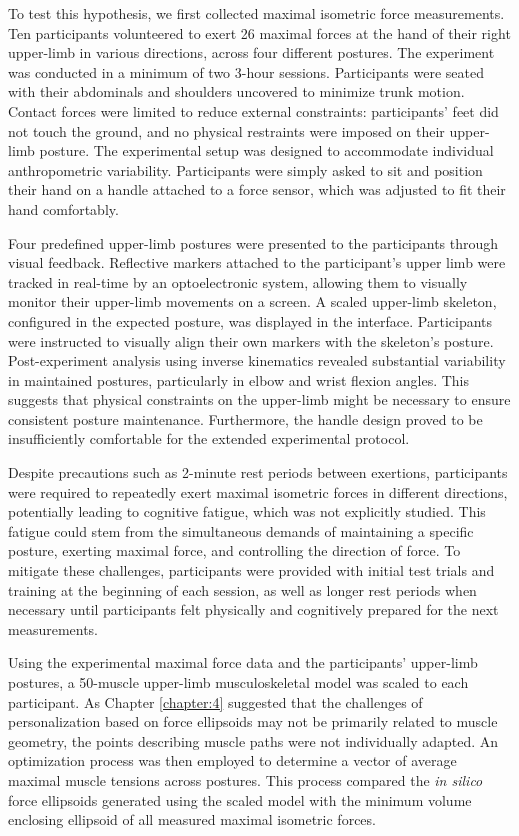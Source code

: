 To test this hypothesis, we first collected maximal isometric force measurements. Ten participants volunteered to exert 26 maximal forces at the hand of their right upper-limb in various directions, across four different postures. The experiment was conducted in a minimum of two 3-hour sessions. Participants were seated with their abdominals and shoulders uncovered to minimize trunk motion. Contact forces were limited to reduce external constraints: participants' feet did not touch the ground, and no physical restraints were imposed on their upper-limb posture. The experimental setup was designed to accommodate individual anthropometric variability. Participants were simply asked to sit and position their hand on a handle attached to a force sensor, which was adjusted to fit their hand comfortably. 

Four predefined upper-limb postures were presented to the participants through visual feedback.  Reflective markers attached to the participant's upper limb were tracked in real-time by an optoelectronic system, allowing them to visually monitor their upper-limb movements on a screen. A scaled upper-limb skeleton, configured in the expected posture, was displayed in the interface. Participants were instructed to visually align their own markers with the skeleton's posture. Post-experiment analysis using inverse kinematics revealed substantial variability in maintained postures, particularly in elbow and wrist flexion angles. This suggests that physical constraints on the upper-limb might be necessary to ensure consistent posture maintenance. Furthermore, the handle design proved to be insufficiently comfortable for the extended experimental protocol.

Despite precautions such as 2-minute rest periods between exertions, participants were required to repeatedly exert maximal isometric forces in different directions, potentially leading to cognitive fatigue, which was not explicitly studied. This fatigue could stem from the simultaneous demands of maintaining a specific posture, exerting maximal force, and controlling the direction of force. To mitigate these challenges, participants were provided with initial test trials and training at the beginning of each session, as well as longer rest periods when necessary until participants felt physically and cognitively prepared for the next measurements.


Using the experimental maximal force data and the participants' upper-limb postures, a 50-muscle upper-limb musculoskeletal model was scaled to each participant. As Chapter \ref{chapter:4} suggested that the challenges of personalization based on force ellipsoids may not be primarily related to muscle geometry, the points describing muscle paths were not individually adapted. An optimization process was then employed to determine a vector of average maximal muscle tensions across postures. This process compared the \emph{in silico} force ellipsoids generated using the scaled model with the minimum volume enclosing ellipsoid of all measured maximal isometric forces.


